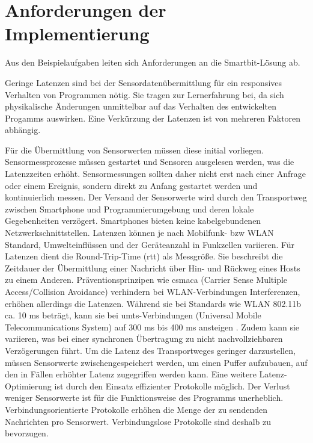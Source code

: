 \documentclass[11pt,a4paper]{report}
\begin{document}
\section{Anforderungen der Implementierung}\label{sec:anforderungen}
Aus den Beispielaufgaben leiten sich Anforderungen an die Smartbit-Lösung ab.

Geringe Latenzen sind bei der Sensordatenübermittlung für ein responsives Verhalten von Programmen nötig.
Sie tragen zur Lernerfahrung bei, da sich physikalische Änderungen unmittelbar auf das Verhalten des entwickelten Progamms auswirken.
Eine Verkürzung der Latenzen ist von mehreren Faktoren abhängig.

Für die Übermittlung von Sensorwerten müssen diese initial vorliegen.
Sensormessprozesse müssen gestartet und Sensoren ausgelesen werden, was die Latenzzeiten erhöht.
Sensormessungen sollten daher nicht erst nach einer Anfrage oder einem Ereignis, sondern direkt zu Anfang gestartet werden und kontinuierlich messen.
Der Versand der Sensorwerte wird durch den Transportweg zwischen Smartphone und Programmierumgebung und deren lokale Gegebenheiten verzögert.
Smartphones bieten keine kabelgebundenen Netzwerkschnittstellen.
Latenzen können je nach Mobilfunk- bzw WLAN Standard, Umwelteinflüssen und der Geräteanzahl in Funkzellen variieren.
Für Latenzen dient die Round-Trip-Time (\acrshort{rtt}) als Messgröße.
Sie beschreibt die Zeitdauer der Übermittlung einer Nachricht über Hin- und Rückweg eines Hosts zu einem Anderen.
Präventionsprinzipen wie \acrshort{csmaca} (Carrier Sense Multiple Access/Collision Avoidance) verhindern bei WLAN-Verbindungen Interferenzen, erhöhen allerdings die Latenzen.
Während sie bei Standards wie WLAN 802.11b ca. 10 ms beträgt, kann sie bei \acrshort{umts}-Verbindungen (Universal Mobile Telecommunications System) auf 300 ms bis 400 ms ansteigen \cite{network_latencies} .
Zudem kann sie variieren, was bei einer synchronen Übertragung zu nicht nachvollziehbaren Verzögerungen führt.
Um die Latenz des Transportweges geringer darzustellen, müssen Sensorwerte zwischengespeichert werden, um einen Puffer aufzubauen, auf den in Fällen erhöhter Latenz zugegriffen werden kann.
Eine weitere Latenz-Optimierung ist durch den Einsatz effizienter Protokolle möglich.
Der Verlust weniger Sensorwerte ist für die Funktionsweise des Programms unerheblich.
Verbindungsorientierte Protokolle erhöhen die Menge der zu sendenden Nachrichten pro Sensorwert.
Verbindungslose Protokolle sind deshalb zu bevorzugen.
\end{document}
